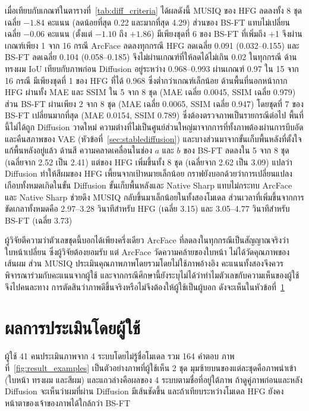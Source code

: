 เมื่อเทียบกับเกณฑ์ในตารางที่~\ref{tab:diff_criteria} ได้ผลดังนี้
MUSIQ ของ HFG ลดลงทั้ง 8 ชุด เฉลี่ย $-1.84$ คะแนน (ลดน้อยที่สุด 0.22 และมากที่สุด 4.29)
ส่วนของ BS-FT แทบไม่เปลี่ยน เฉลี่ย $-0.06$ คะแนน (ตั้งแต่ $-1.10$ ถึง $+1.86$)
มีเพียงชุดที่ 6 ของ BS-FT ที่เพิ่มถึง +1 จึงผ่านเกณฑ์เพียง 1 จาก 16 กรณี
ArcFace ลดลงทุกกรณี HFG ลดเฉลี่ย 0.091 (0.032--0.155) และ BS-FT ลดเฉลี่ย 0.104 (0.058--0.185)
จึงไม่ผ่านเกณฑ์ที่ให้ลดได้ไม่เกิน 0.02 ในทุกกรณี
ด้านทรงผม IoU เทียบกับภาพก่อน Diffusion อยู่ระหว่าง 0.968--0.993 ผ่านเกณฑ์ 0.97 ใน 15 จาก 16 กรณี
มีเพียงชุดที่ 1 ของ HFG ที่ได้ 0.968 ซึ่งต่ำกว่าเกณฑ์เล็กน้อย
ด้านพื้นที่นอกหน้ากาก HFG ผ่านทั้ง MAE และ SSIM ใน 5 จาก 8 ชุด (MAE เฉลี่ย 0.0045, SSIM เฉลี่ย 0.979)
ส่วน BS-FT ผ่านเพียง 2 จาก 8 ชุด (MAE เฉลี่ย 0.0065, SSIM เฉลี่ย 0.947)
โดยชุดที่ 7 ของ BS-FT เปลี่ยนมากที่สุด (MAE 0.0154, SSIM 0.789) ซึ่งต้องตรวจภาพเป็นรายกรณีต่อไป
พื้นที่นี้ไม่ได้ถูก Diffusion วาดใหม่ ความต่างที่ไม่เป็นศูนย์ส่วนใหญ่มาจากการที่ทั้งภาพต้องผ่านการบีบอัดและคืนสภาพของ VAE
(หัวข้อที่~\ref{sec:stablediffusion}) และบางส่วนมาจากขั้นเก็บพื้นหลังที่ตั้งใจแก้พื้นหลังอยู่แล้ว
ด้านสี ความคลาดเคลื่อนในช่อง $a$ และ $b$ ของ BS-FT ลดลงใน 5 จาก 8 ชุด (เฉลี่ยจาก 2.52 เป็น 2.41)
แต่ของ HFG เพิ่มขึ้นทั้ง 8 ชุด (เฉลี่ยจาก 2.62 เป็น 3.09) แปลว่า Diffusion ทำให้สีผมของ HFG เพี้ยนจากเป้าหมายเล็กน้อย
กราฟยังบอกด้วยว่าการเปลี่ยนแปลงเกือบทั้งหมดเกิดในขั้น Diffusion
ขั้นเก็บพื้นหลังและ Native Sharp แทบไม่กระทบ ArcFace และ Native Sharp ช่วยดึง MUSIQ กลับขึ้นมาเล็กน้อยในทั้งสองโมเดล
ส่วนเวลาที่เพิ่มขึ้นจากการขัดเกลาทั้งหมดคือ 2.97--3.28 วินาทีสำหรับ HFG (เฉลี่ย 3.15)
และ 3.05--4.77 วินาทีสำหรับ BS-FT (เฉลี่ย 3.73)

ผู้วิจัยตีความว่าตัวเลขชุดนี้บอกได้เพียงครึ่งเดียว
ArcFace ที่ลดลงในทุกกรณีเป็นสัญญาณจริงว่าใบหน้าเปลี่ยน ซึ่งผู้วิจัยต้องยอมรับ
แต่ ArcFace วัดความคล้ายของใบหน้า ไม่ได้วัดคุณภาพของเส้นผม ส่วน MUSIQ ประเมินคุณภาพภาพโดยรวมโดยไม่ใช้ภาพอ้างอิง
คะแนนทั้งสองจึงควรพิจารณาร่วมกับคะแนนจากผู้ใช้ และจากกรณีศึกษานี้ยังระบุไม่ได้ว่าทำไมตัวเลขกับความเห็นของผู้ใช้จึงไปคนละทาง
การตัดสินว่าภาพดีขึ้นจริงหรือไม่จึงต้องให้ผู้ใช้เป็นผู้บอก ดังจะเห็นในหัวข้อที่~\ref{sec:subjective}

\section{ผลการประเมินโดยผู้ใช้}
\label{sec:subjective}

ผู้ใช้ 41 คนประเมินภาพจาก 4 ระบบโดยไม่รู้ชื่อโมเดล รวม 164 คำตอบ
ภาพที่~\ref{fig:result_examples} เป็นตัวอย่างภาพที่ผู้ใช้เห็น 2 ชุด
มุมซ้ายบนของแต่ละชุดคือภาพนำเข้า (ใบหน้า ทรงผม และสีผม) และแถวล่างคือผลของ 4 ระบบตามชื่อที่อยู่ใต้ภาพ
ถ้าดูคู่ภาพก่อนและหลัง Diffusion จะเห็นว่าผมที่ผ่าน Diffusion มีเส้นชัดขึ้น
และถ้าเทียบระหว่างโมเดล HFG ยังคงหน้าตาของเจ้าของภาพได้ใกล้กว่า BS-FT

